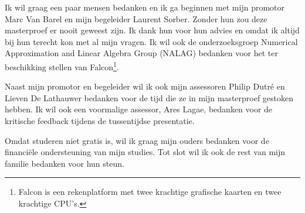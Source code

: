 \documentclass[master=cws ,masteroption=gs]{kulemt}
\begin{document}
\begin{preface}
	Ik wil graag een paar mensen bedanken en ik ga beginnen met mijn promotor Marc Van Barel en mijn begeleider Laurent Sorber. Zonder hun zou deze masterproef er nooit geweest zijn. Ik dank hun voor hun advies en omdat ik altijd bij hun terecht kon met al mijn vragen. Ik wil ook de onderzoeksgroep Numerical Approximation and Linear Algebra Group (NALAG) bedanken voor het ter beschikking stellen van Falcon\footnote{Falcon is een rekenplatform met twee krachtige grafische kaarten en twee krachtige CPU's.}.
	
	Naast mijn promotor en begeleider wil ik ook mijn assessoren Philip Dutr\'e en Lieven De Lathauwer bedanken voor de tijd die ze in mijn masterproef gestoken hebben. Ik wil ook een voormalige assessor, Ares Lagae, bedanken voor de kritische feedback tijdens de tussentijdse presentatie.
	
	Omdat studeren niet gratis is, wil ik graag mijn ouders bedanken voor de financi\"ele ondersteuning van mijn studies.
	Tot slot wil ik ook de rest van mijn familie bedanken voor hun steun.
\end{preface}

\tableofcontents*
\end{document}
